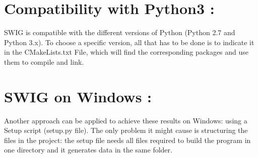 \section{Compatibility with Python3 :}
SWIG is compatible with the different versions of Python (Python 2.7 and Python 3.x). To choose a specific version, all that has to be done is to indicate it in the CMakeLists.txt File, which will find the corresponding packages and use them to compile and link.

\section{SWIG on Windows :}
Another approach can be applied to achieve these results on Windows: using a Setup script (setup.py file). The only problem it might cause is structuring the files in the project: the setup file needs all files required to build the program in one directory and it generates data in the same folder.
